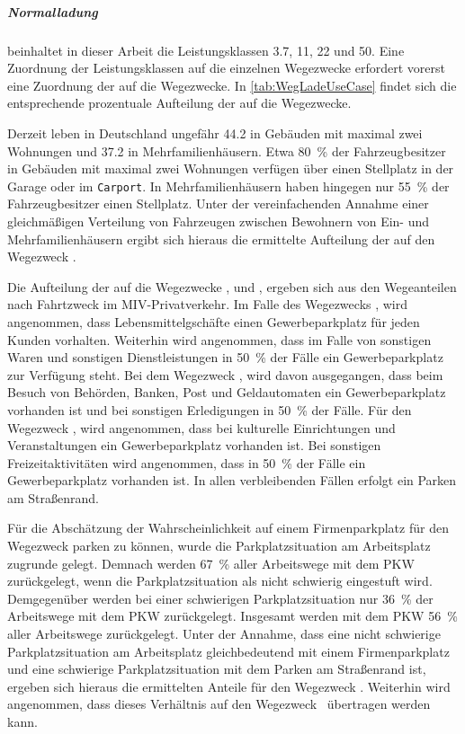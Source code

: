\subparagraph{Normalladung} beinhaltet in dieser Arbeit die Leistungsklassen \SI{3.7}{\kw}, \SI{11}{\kw}, \SI{22}{\kw} und \SI{50}{\kw}.
Eine Zuordnung der Leistungsklassen auf die einzelnen Wegezwecke erfordert vorerst eine Zuordnung der \UCs auf die Wegezwecke.
In \autoref{tab:WegLadeUseCase} findet sich die entsprechende prozentuale Aufteilung der \UCs auf die Wegezwecke.



Derzeit leben in Deutschland ungefähr \SI{44.2}{\MioMen} in Gebäuden mit maximal zwei Wohnungen und \SI{37.2}{\MioMen} in Mehrfamilienhäusern.
Etwa \SI{80}{\percent} der Fahrzeugbesitzer in Gebäuden mit maximal zwei Wohnungen verfügen über einen Stellplatz in der Garage oder im \texttt{Carport}.
In Mehrfamilienhäusern haben hingegen nur \SI{55}{\percent} der Fahrzeugbesitzer einen Stellplatz. \cite{dena2020}
Unter der vereinfachenden Annahme einer gleichmäßigen Verteilung von Fahrzeugen zwischen Bewohnern von Ein- und Mehrfamilienhäusern ergibt sich hieraus die ermittelte Aufteilung der \UCs auf den Wegezweck \nHdot.\medskip

Die Aufteilung der \UCs auf die Wegezwecke \Einkaufdot, \Erledigung und \Freizeitdot, ergeben sich aus den Wegeanteilen nach Fahrtzweck im \gls{MIV}-Privatverkehr. \cite{Rikus2015}
Im Falle des Wegezwecks \Einkaufdot, wird angenommen, dass Lebensmittelgschäfte einen Gewerbeparkplatz für jeden Kunden vorhalten.
Weiterhin wird angenommen, dass im Falle von sonstigen Waren und sonstigen Dienstleistungen in \SI{50}{\percent} der Fälle ein Gewerbeparkplatz zur Verfügung steht.
Bei dem Wegezweck \Erledigungdot, wird davon ausgegangen, dass beim Besuch von Behörden, Banken, Post und Geldautomaten ein Gewerbeparkplatz vorhanden ist und bei sonstigen Erledigungen in \SI{50}{\percent} der Fälle.
Für den Wegezweck \Freizeitdot, wird angenommen, dass bei kulturelle Einrichtungen und Veranstaltungen ein Gewerbeparkplatz vorhanden ist.
Bei sonstigen Freizeitaktivitäten wird angenommen, dass in \SI{50}{\percent} der Fälle ein Gewerbeparkplatz vorhanden ist.
In allen verbleibenden Fällen erfolgt ein Parken am Straßenrand.\medskip

Für die Abschätzung der Wahrscheinlichkeit auf einem Firmenparkplatz für den Wegezweck \Arbeit parken zu können, wurde die Parkplatzsituation am Arbeitsplatz zugrunde gelegt.
Demnach werden \SI{67}{\percent} aller Arbeitswege mit dem \gls{PKW} zurückgelegt, wenn die Parkplatzsituation als nicht schwierig eingestuft wird.
Demgegenüber werden bei einer schwierigen Parkplatzsituation nur \SI{36}{\percent} der Arbeitswege mit dem \gls{PKW} zurückgelegt.
Insgesamt werden mit dem \gls{PKW} \SI{56}{\percent} aller Arbeitswege zurückgelegt. \cite{Ecke2020}
Unter der Annahme, dass eine nicht schwierige Parkplatzsituation am Arbeitsplatz gleichbedeutend mit einem Firmenparkplatz und eine schwierige Parkplatzsituation mit dem Parken am Straßenrand ist, ergeben sich hieraus die ermittelten Anteile für den Wegezweck \Arbeitdot.
Weiterhin wird angenommen, dass dieses Verhältnis auf den Wegezweck \Ausbildung~übertragen werden kann.\medskip

